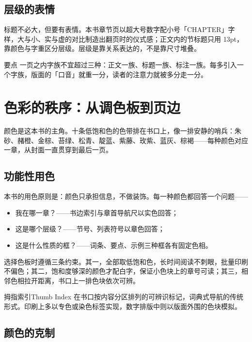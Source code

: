 \documentclass{bookedge}
\begin{document}
\section{层级的表情}

标题不必大，但要有表情。本书章节页以超大号数字配小号「CHAPTER」字样，大与小、实与虚的对比制造出翻页时的仪式感；正文内的节标题只用 13pt，靠颜色与字重区分层级。层级是靠关系表达的，不是靠尺寸堆叠。

\begin{notebox}{要点}
一页之内字族不宜超过三种：正文一族、标题一族、标注一族。每多引入一个字族，版面的「口音」就重一分，读者的注意力就被多分走一分。
\end{notebox}

\chapter{色彩的秩序：从调色板到页边}

颜色是这本书的主角。十条低饱和色的色带排在书口上，像一排安静的哨兵：朱砂、赭橙、金棕、苔绿、松青、靛蓝、紫藤、玫紫、蓝灰、棕褐——每种颜色对应一章，从封面一直贯穿到最后一页。

\section{功能性用色}

本书的用色原则是：颜色只承担信息，不做装饰。每一种颜色都回答一个问题——

\begin{itemize}
  \item 我在哪一章？——书边索引与章首导航尺以实色回答；
  \item 这是哪个层级？——节号、列表符号以章色回答；
  \item 这是什么性质的框？——词条、要点、示例三种框各有固定色相。
\end{itemize}

选择色板时遵循三条约束。其一，全部取低饱和色，长时间阅读不刺眼，批量印刷不偏色；其二，饱和度够深的颜色才配白字，保证小色块上的章号可读；其三，相邻色相拉开距离，书口上一排色块依次可辨。

\begin{entry}{拇指索引}{Thumb Index}
在书口按内容分区排列的可辨识标记，词典式导航的传统形式。印刷上多以专色或染色标签实现，数字排版中则以版面外围的色块模拟。
\end{entry}

\section{颜色的克制}
\end{document}
